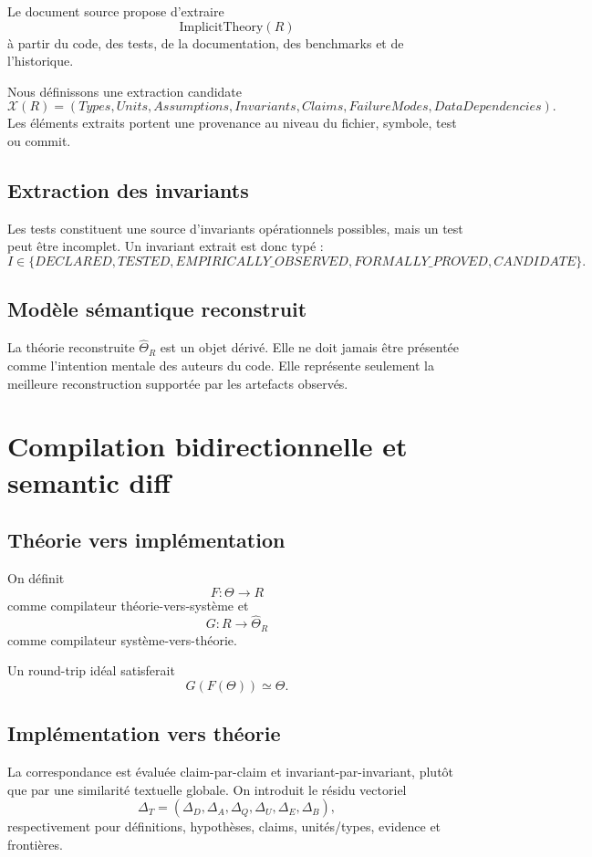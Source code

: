 Le document source propose d'extraire
\[
\mathrm{ImplicitTheory}(R)
\]
à partir du code, des tests, de la documentation, des benchmarks et de l'historique.

Nous définissons une extraction candidate
\[
\mathcal X(R)=(Types,Units,Assumptions,Invariants,Claims,FailureModes,DataDependencies).
\]
Les éléments extraits portent une provenance au niveau du fichier, symbole, test ou commit.

\section{Extraction des invariants}

Les tests constituent une source d'invariants opérationnels possibles, mais un test peut être incomplet. Un invariant extrait est donc typé :
\[
I\in\{DECLARED,TESTED,EMPIRICALLY\_OBSERVED,FORMALLY\_PROVED,CANDIDATE\}.
\]

\section{Modèle sémantique reconstruit}

La théorie reconstruite $\widehat\Theta_R$ est un objet dérivé. Elle ne doit jamais être présentée comme l'intention mentale des auteurs du code. Elle représente seulement la meilleure reconstruction supportée par les artefacts observés.

\chapter{Compilation bidirectionnelle et semantic diff}

\section{Théorie vers implémentation}

On définit
\[
F:\Theta\to R
\]
comme compilateur théorie-vers-système et
\[
G:R\to\widehat\Theta_R
\]
comme compilateur système-vers-théorie.

Un round-trip idéal satisferait
\[
G(F(\Theta))\simeq\Theta.
\]

\section{Implémentation vers théorie}

La correspondance est évaluée claim-par-claim et invariant-par-invariant, plutôt que par une similarité textuelle globale. On introduit le résidu vectoriel
\[
\Delta_T=(\Delta_D,\Delta_A,\Delta_Q,\Delta_U,\Delta_E,\Delta_B),
\]
respectivement pour définitions, hypothèses, claims, unités/types, evidence et frontières.

